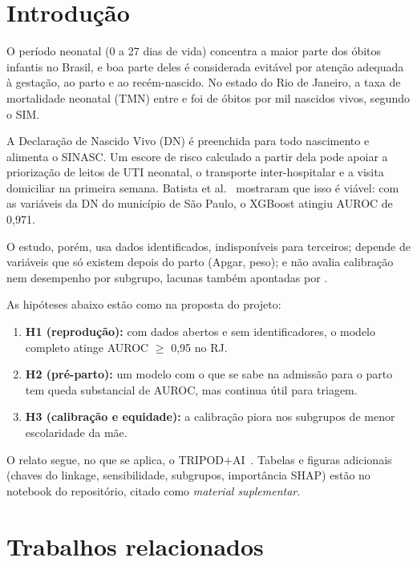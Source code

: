 \documentclass[12pt]{article}
\begin{document}
\section{Introdução}

O período neonatal (0 a 27 dias de vida) concentra a maior parte dos óbitos infantis no Brasil, e boa parte deles é considerada evitável por atenção adequada à gestação, ao parto e ao recém-nascido. No estado do Rio de Janeiro, a taxa de mortalidade neonatal (TMN) entre \anoIni{} e \anoFim foi de \tmnSIM{} óbitos por mil nascidos vivos, segundo o SIM.

A Declaração de Nascido Vivo (DN) é preenchida para todo nascimento e alimenta o SINASC. Um escore de risco calculado a partir dela pode apoiar a priorização de leitos de UTI neonatal, o transporte inter-hospitalar e a visita domiciliar na primeira semana. Batista et al.~\cite{batista2021} mostraram que isso é viável: com as variáveis da DN do município de São Paulo, o XGBoost atingiu AUROC de 0,971.

O estudo, porém, usa dados identificados, indisponíveis para terceiros; depende de variáveis que só existem depois do parto (Apgar, peso); e não avalia calibração nem desempenho por subgrupo, lacunas também apontadas por \cite{mangold2021}.

As hipóteses abaixo estão como na proposta do projeto:
\begin{enumerate}
  \item \textbf{H1 (reprodução):} com dados abertos e sem identificadores, o modelo completo atinge AUROC $\geq$ 0,95 no RJ.
  \item \textbf{H2 (pré-parto):} um modelo com o que se sabe na admissão para o parto tem queda substancial de AUROC, mas continua útil para triagem.
  \item \textbf{H3 (calibração e equidade):} a calibração piora nos subgrupos de menor escolaridade da mãe.
\end{enumerate}

O relato segue, no que se aplica, o TRIPOD+AI~\cite{collins2024}. Tabelas e figuras adicionais (chaves do linkage, sensibilidade, subgrupos, importância SHAP) estão no notebook do repositório, citado como \emph{material suplementar}.

\section{Trabalhos relacionados}
\end{document}
